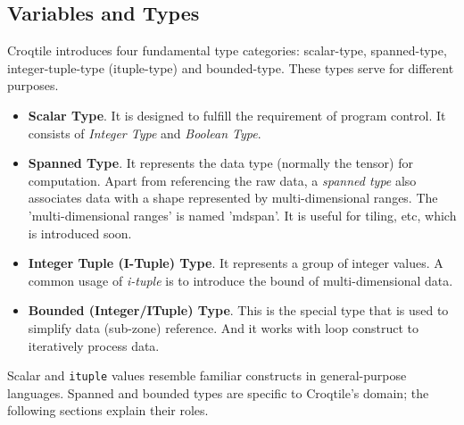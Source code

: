 \subsection*{Variables and Types}

Croqtile introduces four fundamental type categories: scalar-type, spanned-type, integer-tuple-type (ituple-type) and bounded-type. These types serve for different purposes.

\begin{itemize}[leftmargin=1.6em]
\item \textbf{Scalar Type}. It is designed to fulfill the requirement of program control. It consists of \emph{Integer Type} and \emph{Boolean Type}.
\item \textbf{Spanned Type}. It represents the data type (normally the tensor) for computation. Apart from referencing the raw data, a \emph{spanned type} also associates data with a shape represented by multi-dimensional ranges. The 'multi-dimensional ranges' is named 'mdspan'. It is useful for tiling, etc, which is introduced soon.
\item \textbf{Integer Tuple (I-Tuple) Type}. It represents a group of integer values. A common usage of \emph{i-tuple} is to introduce the bound of multi-dimensional data.
\item \textbf{Bounded (Integer/ITuple) Type}. This is the special type that is used to simplify data (sub-zone) reference. And it works with loop construct to iteratively process data.
\end{itemize}

Scalar and \texttt{ituple} values resemble familiar constructs in general-purpose languages. Spanned and bounded types are specific to Croqtile's domain; the following sections explain their roles.
